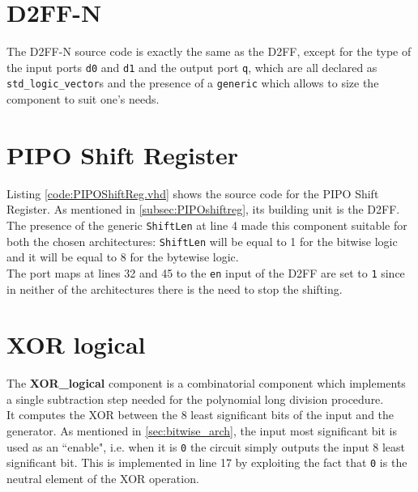 \section{D2FF-N}\label{code:D2FF_N.vhd}
The D2FF-N source code is exactly the same as the D2FF, except for the type of the input ports \texttt{d0} and \texttt{d1} and the output port \texttt{q}, which are all declared as \texttt{std\_logic\_vector}s and the presence of a \texttt{generic} which allows to size the component to suit one's needs.

\section{PIPO Shift Register}\label{sec:PIPOShiftReg.vhd}
\lstset{style=codestyle}\label{code:PIPOShiftReg.vhd}

\hfill \break
Listing \ref{code:PIPOShiftReg.vhd} shows the source code for the PIPO Shift Register. As mentioned in \ref{subsec:PIPOshiftreg}, its building unit is the D2FF. The presence of the generic \texttt{ShiftLen} at line 4 made this component suitable for both the chosen architectures: \texttt{ShiftLen} will be equal to 1 for the bitwise logic and it will be equal to 8 for the bytewise logic.\\
The port maps at lines 32 and 45 to the \texttt{en} input of the D2FF are set to \texttt{1} since in neither of the architectures there is the need to stop the shifting.\\

\section{XOR logical}\label{sec:XOR_logical.vhd}
\lstset{style=codestyle}\label{code:XOR_logical.vhd}

\hfill \break
The \textbf{XOR\_logical} component is a combinatorial component which implements a single subtraction step needed for the polynomial long division procedure.\\
It computes the XOR between the 8 least significant bits of the input and the generator. As mentioned in \ref{sec:bitwise_arch}, the input most significant bit is used as an ``enable", i.e. when it is \texttt{0} the circuit simply outputs the input 8 least significant bit. This is implemented in line 17 by exploiting the fact that \texttt{0} is the neutral element of the XOR operation.\\

